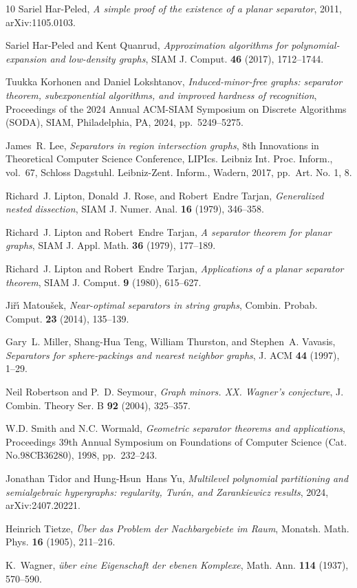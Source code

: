 \documentclass[11pt, reqno]{amsart}
\theoremstyle{plain}
\theoremstyle{definition}
\theoremstyle{remark}
\numberwithin{theorem}{section}
\numberwithin{equation}{section}
\begin{document}
\begin{thebibliography}{10}
Sariel Har-Peled, \emph{A simple proof of the existence of a planar separator}, 2011, arXiv:1105.0103.

Sariel Har-Peled and Kent Quanrud, \emph{Approximation algorithms for polynomial-expansion and low-density graphs}, SIAM J. Comput. \textbf{46} (2017), 1712--1744.

Tuukka Korhonen and Daniel Lokshtanov, \emph{Induced-minor-free graphs: separator theorem, subexponential algorithms, and improved hardness of recognition}, Proceedings of the 2024 {A}nnual {ACM}-{SIAM} {S}ymposium on {D}iscrete {A}lgorithms ({SODA}), SIAM, Philadelphia, PA, 2024, pp.~5249--5275.

James~R. Lee, \emph{Separators in region intersection graphs}, 8th {I}nnovations in {T}heoretical {C}omputer {S}cience {C}onference, LIPIcs. Leibniz Int. Proc. Inform., vol.~67, Schloss Dagstuhl. Leibniz-Zent. Inform., Wadern, 2017, pp.~Art. No. 1, 8.

Richard~J. Lipton, Donald~J. Rose, and Robert~Endre Tarjan, \emph{Generalized nested dissection}, SIAM J. Numer. Anal. \textbf{16} (1979), 346--358.

Richard~J. Lipton and Robert~Endre Tarjan, \emph{A separator theorem for planar graphs}, SIAM J. Appl. Math. \textbf{36} (1979), 177--189.

Richard~J. Lipton and Robert~Endre Tarjan, \emph{Applications of a planar separator theorem}, SIAM J. Comput. \textbf{9} (1980), 615--627.

Ji\v{r}\'{\i} Matou\v{s}ek, \emph{Near-optimal separators in string graphs}, Combin. Probab. Comput. \textbf{23} (2014), 135--139.

Gary~L. Miller, Shang-Hua Teng, William Thurston, and Stephen~A. Vavasis, \emph{Separators for sphere-packings and nearest neighbor graphs}, J. ACM \textbf{44} (1997), 1--29.

Neil Robertson and P.~D. Seymour, \emph{Graph minors. {XX}. {W}agner's conjecture}, J. Combin. Theory Ser. B \textbf{92} (2004), 325--357.

W.D. Smith and N.C. Wormald, \emph{Geometric separator theorems and applications}, Proceedings 39th Annual Symposium on Foundations of Computer Science (Cat. No.98CB36280), 1998, pp.~232--243.

Jonathan Tidor and Hung-Hsun~Hans Yu, \emph{Multilevel polynomial partitioning and semialgebraic hypergraphs: regularity, {T}ur\'an, and {Z}arankiewicz results}, 2024, arXiv:2407.20221.

Heinrich Tietze, \emph{{\"{U}}ber das {P}roblem der {N}achbargebiete im {R}aum}, Monatsh. Math. Phys. \textbf{16} (1905), 211--216.

K.~Wagner, \emph{\"uber eine {E}igenschaft der ebenen {K}omplexe}, Math. Ann. \textbf{114} (1937), 570--590.

\end{thebibliography}
\end{document}
